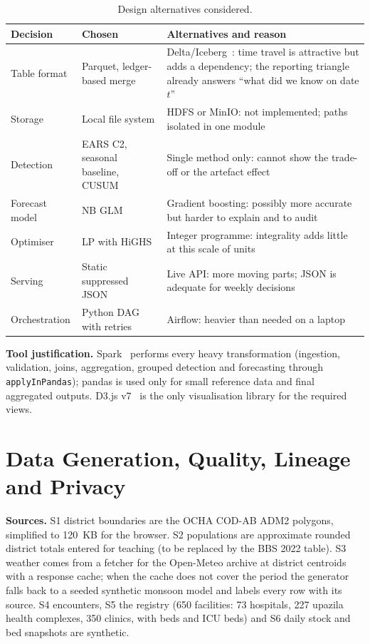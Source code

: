 \documentclass[conference]{IEEEtran}
\begin{document}
\begin{table}[t]\caption{Design alternatives considered.}\label{tab:alt}\centering\small
\begin{tabularx}{\columnwidth}{@{}lXX@{}}\toprule
Decision & Chosen & Alternatives and reason \\\midrule
Table format & Parquet, ledger-based merge & Delta/Iceberg~\cite{delta}: time travel is attractive but adds a dependency; the reporting triangle already answers ``what did we know on date $t$'' \\
Storage & Local file system & HDFS or MinIO: not implemented; paths isolated in one module \\
Detection & EARS C2, seasonal baseline, CUSUM & Single method only: cannot show the trade-off or the artefact effect \\
Forecast model & NB GLM & Gradient boosting: possibly more accurate but harder to explain and to audit \\
Optimiser & LP with HiGHS & Integer programme: integrality adds little at this scale of units \\
Serving & Static suppressed JSON & Live API: more moving parts; JSON is adequate for weekly decisions \\
Orchestration & Python DAG with retries & Airflow: heavier than needed on a laptop \\\bottomrule
\end{tabularx}\end{table}

\textbf{Tool justification.} Spark~\cite{spark} performs every heavy transformation (ingestion, validation, joins, aggregation, grouped detection and forecasting through \texttt{applyInPandas}); pandas is used only for small reference data and final aggregated outputs. D3.js v7~\cite{d3} is the only visualisation library for the required views.
\section{Data Generation, Quality, Lineage and Privacy}\label{sec:data}
\textbf{Sources.} S1 district boundaries are the OCHA COD-AB ADM2 polygons, simplified to 120~KB for the browser. S2 populations are approximate rounded district totals entered for teaching (to be replaced by the BBS 2022 table). S3 weather comes from a fetcher for the Open-Meteo archive at district centroids with a response cache; when the cache does not cover the period the generator falls back to a seeded synthetic monsoon model and labels every row with its source. S4 encounters, S5 the registry (650 facilities: 73 hospitals, 227 upazila health complexes, 350 clinics, with beds and ICU beds) and S6 daily stock and bed snapshots are synthetic.
\end{document}
